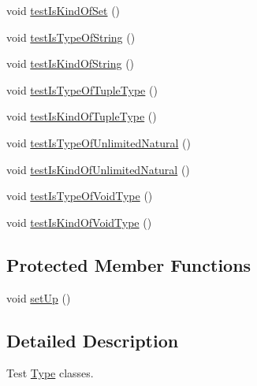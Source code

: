 \begin{DoxyCompactItemize}
\item 
void \hyperlink{classorg_1_1tzi_1_1use_1_1uml_1_1ocl_1_1type_1_1_type_test_a5a208cf460326d196662523420447aae}{test\-Is\-Kind\-Of\-Set} ()
\item 
void \hyperlink{classorg_1_1tzi_1_1use_1_1uml_1_1ocl_1_1type_1_1_type_test_a53e8e876edab826457f21a168b70276f}{test\-Is\-Type\-Of\-String} ()
\item 
void \hyperlink{classorg_1_1tzi_1_1use_1_1uml_1_1ocl_1_1type_1_1_type_test_ae2cadc8cc176033db723960c668f07a8}{test\-Is\-Kind\-Of\-String} ()
\item 
void \hyperlink{classorg_1_1tzi_1_1use_1_1uml_1_1ocl_1_1type_1_1_type_test_a6ba27d5ae316598520f7f554ff87603a}{test\-Is\-Type\-Of\-Tuple\-Type} ()
\item 
void \hyperlink{classorg_1_1tzi_1_1use_1_1uml_1_1ocl_1_1type_1_1_type_test_a0d1b5e8328539508134271aed178f953}{test\-Is\-Kind\-Of\-Tuple\-Type} ()
\item 
void \hyperlink{classorg_1_1tzi_1_1use_1_1uml_1_1ocl_1_1type_1_1_type_test_a45c793f94e0648af684a7d8702f70a9b}{test\-Is\-Type\-Of\-Unlimited\-Natural} ()
\item 
void \hyperlink{classorg_1_1tzi_1_1use_1_1uml_1_1ocl_1_1type_1_1_type_test_adbfec2eae65043bf8172ac1f43305d67}{test\-Is\-Kind\-Of\-Unlimited\-Natural} ()
\item 
void \hyperlink{classorg_1_1tzi_1_1use_1_1uml_1_1ocl_1_1type_1_1_type_test_add95e0eac3575bc53dcf2472ebfa8236}{test\-Is\-Type\-Of\-Void\-Type} ()
\item 
void \hyperlink{classorg_1_1tzi_1_1use_1_1uml_1_1ocl_1_1type_1_1_type_test_a6caff37ce748814149fd95d713b34ff0}{test\-Is\-Kind\-Of\-Void\-Type} ()
\end{DoxyCompactItemize}
\subsection*{Protected Member Functions}
\begin{DoxyCompactItemize}
\item 
void \hyperlink{classorg_1_1tzi_1_1use_1_1uml_1_1ocl_1_1type_1_1_type_test_af46d40993ca29ffb99f3cec1d5bbd298}{set\-Up} ()
\end{DoxyCompactItemize}


\subsection{Detailed Description}
Test \hyperlink{interfaceorg_1_1tzi_1_1use_1_1uml_1_1ocl_1_1type_1_1_type}{Type} classes.

